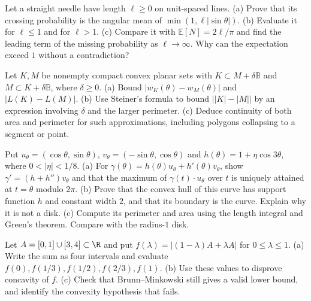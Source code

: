 \begin{exercise}[$\star\star$]\label{ex:v9-app-j-long-needle}
Let a straight needle have length $\ell\ge0$ on unit-spaced lines.
(a) Prove that its crossing probability is the angular mean of $\min(1,\ell|\sin\theta|)$.
(b) Evaluate it for $\ell\le1$ and for $\ell>1$.
(c) Compare it with $\mathbb E[N]=2\ell/\pi$ and find the leading term of the missing probability as $\ell\to\infty$. Why can the expectation exceed $1$ without a contradiction?
\end{exercise}

\begin{exercise}[$\star\star$]\label{ex:v9-app-j-parallel-stability}
Let $K,M$ be nonempty compact convex planar sets with
$K\subset M+\delta\mathbb B$ and $M\subset K+\delta\mathbb B$, where $\delta\ge0$.
(a) Bound $|w_K(\theta)-w_M(\theta)|$ and $|L(K)-L(M)|$.
(b) Use Steiner's formula to bound $\bigl||K|-|M|\bigr|$ by an expression involving $\delta$ and the larger perimeter.
(c) Deduce continuity of both area and perimeter for such approximations, including polygons collapsing to a segment or point.
\end{exercise}

\begin{exercise}[$\star\star\star$]\label{ex:v9-app-j-smooth-width}
Put $u_\theta=(\cos\theta,\sin\theta)$, $v_\theta=(-\sin\theta,\cos\theta)$ and
$h(\theta)=1+\eta\cos3\theta$, where $0<|\eta|<1/8$.
(a) For $\gamma(\theta)=h(\theta)u_\theta+h'(\theta)v_\theta$, show $\gamma'=(h+h'')v_\theta$ and that the maximum of $\gamma(t)\cdot u_\theta$ over $t$ is uniquely attained at $t=\theta$ modulo $2\pi$.
(b) Prove that the convex hull of this curve has support function $h$ and constant width $2$, and that its boundary is the curve. Explain why it is not a disk.
(c) Compute its perimeter and area using the length integral and Green's theorem. Compare with the radius-$1$ disk.
\end{exercise}

\begin{exercise}[$\star\star$]\label{ex:v9-app-j-concavity-obstruction}
Let $A=[0,1]\cup[3,4]\subset\R$ and put $f(\lambda)=|(1-\lambda)A+\lambda A|$ for $0\le\lambda\le1$.
(a) Write the sum as four intervals and evaluate $f(0),f(1/3),f(1/2),f(2/3),f(1)$.
(b) Use these values to disprove concavity of $f$.
(c) Check that Brunn--Minkowski still gives a valid lower bound, and identify the convexity hypothesis that fails.
\end{exercise}

